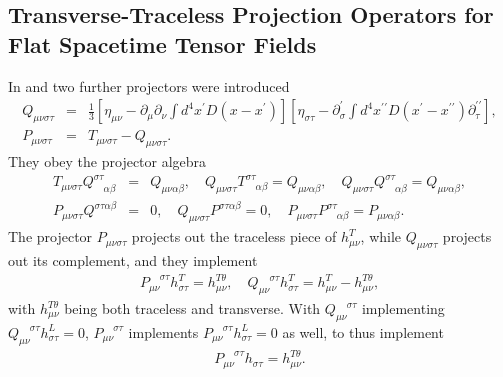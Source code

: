 \documentclass[aps,onecolumn,10pt]{revtex4}
\numberwithin{equation}{section}
\numberwithin{equation}{section}
\begin{document}
\subsection{Transverse-Traceless Projection Operators for Flat Spacetime Tensor Fields}


In \cite{Mannheim2005} and \cite{Amarasinghe2018} two further projectors were introduced
%
\begin{eqnarray}
Q_{\mu\nu\sigma\tau}&=&\frac{1}{3}\left[\eta_{\mu\nu}
-\partial_{\mu}\partial_{\nu}\int d^4x^{\prime}D(x-x^{\prime})\right]
\left[\eta_{\sigma\tau}-\partial^{\prime}_{\sigma}\int
d^4x^{\prime\prime}D(x^{\prime}-x^{\prime\prime})\partial^{\prime\prime}_{\tau}\right],
\nonumber\\
P_{\mu\nu\sigma\tau}&=&T_{\mu\nu\sigma\tau}-Q_{\mu\nu\sigma\tau}.
\label{A.18a}
\end{eqnarray}
%  
They obey the projector algebra
%
\begin{eqnarray}
T_{\mu\nu\sigma\tau}Q^{\sigma\tau}_{\phantom{\sigma\tau}\alpha\beta}
&=&Q_{\mu\nu\alpha\beta},\quad
Q_{\mu\nu\sigma\tau}T^{\sigma\tau}_{\phantom{\sigma\tau}\alpha\beta}
=Q_{\mu\nu\alpha\beta},\quad
Q_{\mu\nu\sigma\tau}Q^{\sigma\tau}_{\phantom{\sigma\tau}\alpha\beta}
=Q_{\mu\nu\alpha\beta}, 
\nonumber\\
P_{\mu\nu\sigma\tau}Q^{\sigma\tau\alpha\beta}&=&0,\quad
Q_{\mu\nu\sigma\tau}P^{\sigma\tau\alpha\beta}=0,\quad
P_{\mu\nu\sigma\tau}P^{\sigma\tau}_{\phantom{\sigma\tau}\alpha\beta}
=P_{\mu\nu\alpha\beta}.
\label{A.19a}
\end{eqnarray}
%
The projector $P_{\mu\nu\sigma\tau}$ projects out the traceless piece of $h^T_{\mu\nu}$, while $Q_{\mu\nu\sigma\tau}$ projects out its complement, and they implement
%
\begin{eqnarray}
P_{\mu\nu}^{\phantom{\mu\nu}\sigma\tau}h^T_{\sigma\tau}=h^{T\theta}_{\mu\nu},\quad 
Q_{\mu\nu}^{\phantom{\mu\nu}\sigma\tau}h^T_{\sigma\tau}
=h^T_{\mu\nu}-h^{T\theta}_{\mu\nu},
\label{A.20a}
\end{eqnarray}
% 
with $h^{T\theta}_{\mu\nu}$ being both traceless and transverse. With $Q_{\mu\nu}^{\phantom{\mu\nu}\sigma\tau}$ implementing $Q_{\mu\nu}^{\phantom{\mu\nu}\sigma\tau}h^L_{\sigma\tau}=0$, $P_{\mu\nu}^{\phantom{\mu\nu}\sigma\tau}$ implements $P_{\mu\nu}^{\phantom{\mu\nu}\sigma\tau}h^L_{\sigma\tau}=0$ as well, to thus implement 
%
\begin{eqnarray}
 P_{\mu\nu}^{\phantom{\mu\nu}\sigma\tau}h_{\sigma\tau}=h^{T\theta}_{\mu\nu}.
\label{A.21a}
\end{eqnarray}
\end{document}
